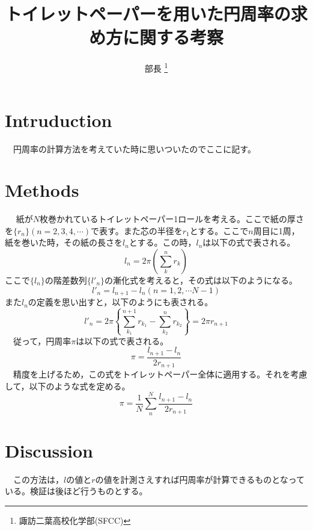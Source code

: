 \documentclass[a4j]{jarticle}
\title{トイレットペーパーを用いた円周率の求め方に関する考察}
\author{部長 \thanks{諏訪二葉高校化学部(SFCC)}}
\numberwithin{equation}{section}
\begin{document}
\maketitle
\section{Intruduction}
　円周率の計算方法を考えていた時に思いついたのでここに記す。
\section{Methods}
　 紙が$N$枚巻かれているトイレットペーパー1ロールを考える。ここで紙の厚さを$\{r_n\}(n=2, 3, 4, \cdots)$で表す。また芯の半径を$r_1$とする。ここで$n$周目に1周，紙を巻いた時，その紙の長さを$l_n$とする。この時，$l_n$は以下の式で表される。
\begin{equation*}
l_n = 2 \pi \left(\sum^n_k r_k\right)
\end{equation*}
ここで$\{l_n\}$の階差数列$\{l'_n\}$の漸化式を考えると，その式は以下のようになる。
\begin{equation*}
l'_n = l_{n+1} - l_n (n=1, 2, \cdots N-1)
\end{equation*}
また$l_n$の定義を思い出すと，以下のようにも表される。
\begin{equation*}
l'_n = 2\pi\left\{\sum^{n+1}_{k_1} r_{k_1} -  \sum^{n}_{k_2} r_{k_2} \right\} = 2\pi r_{n+1}
\end{equation*}
　従って，円周率$\pi$は以下の式で表される。
\begin{equation*}
\pi = \frac{l_{n+1} - l_n}{2r_{n+1}}
\end{equation*}
　精度を上げるため，この式をトイレットペーパー全体に適用する。それを考慮して，以下のような式を定める。
\begin{equation*}
\pi = \frac{1}{N} \sum^N_n \frac{l_{n+1} - l_n}{2r_{n+1}}
\end{equation*}
\section{Discussion}
　この方法は，$l$の値と$r$の値を計測さえすれば円周率が計算できるものとなっている。検証は後ほど行うものとする。
\end{document}

